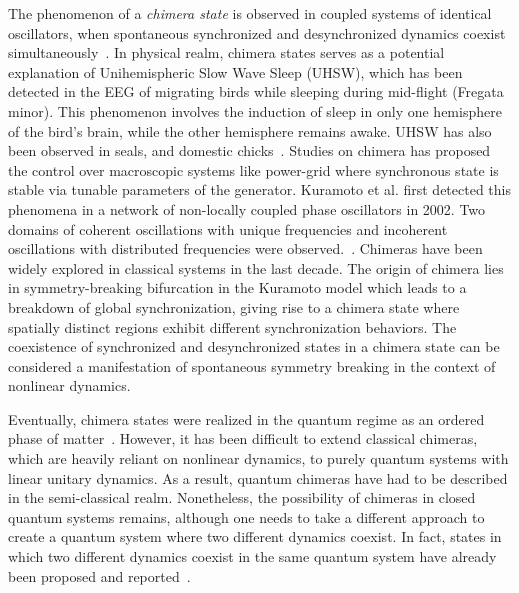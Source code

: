 \documentclass[12pt]{iopart}
\begin{document}
The phenomenon of a \textit{ chimera state} is observed in coupled systems of  identical oscillators, when spontaneous synchronized and desynchronized dynamics coexist simultaneously~\cite{kuramoto_coexistence_2002, panaggio_chimera_2015}. In physical realm, chimera states serves as a potential explanation of Unihemispheric Slow Wave Sleep (UHSW), which has been detected in the EEG of migrating birds while sleeping during mid-flight (Fregata minor\cite{Rattenborg2016}). This phenomenon involves the induction of sleep in only one hemisphere of the bird's brain, while the other hemisphere remains awake. UHSW has also been observed in seals, and domestic chicks~\cite{Mascetti2016}. Studies on chimera has proposed the control over macroscopic systems like power-grid where synchronous state is stable via tunable parameters of the generator\cite{Motter2013}. Kuramoto et al. first detected this phenomena in a network of non-locally coupled phase oscillators in 2002. Two domains of coherent oscillations with unique frequencies and incoherent oscillations with distributed frequencies were observed.~\cite{kuramoto_coexistence_2002}.
Chimeras have been widely explored in classical systems in the last decade\cite{parastesh_chimeras_2021,chimera_book, taniya2022}. The origin of chimera lies in symmetry-breaking bifurcation in the Kuramoto model\cite{Kotwal2017} which leads to a breakdown of global synchronization, giving rise to a chimera state where spatially distinct regions exhibit different synchronization behaviors. The coexistence of synchronized and desynchronized states in a chimera state can be considered a manifestation of spontaneous symmetry breaking in the context of nonlinear dynamics\cite{Aneta2013}.

Eventually, chimera states were realized in the quantum regime as an ordered phase of matter~\cite{bastidas_quantum_2015}. However, it has been difficult to extend classical chimeras, which are heavily reliant on nonlinear dynamics, to purely quantum systems with linear unitary dynamics. As a result, quantum chimeras have had to be described in the semi-classical realm. Nonetheless, the possibility of chimeras in closed quantum systems remains, although one needs to take a different approach to create a quantum system where two different dynamics coexist. In fact, states in which two different dynamics coexist in the same quantum system have already been proposed and reported~\cite{Bastidas2018, Zha2020, sakurai_phys_nodate}.
\end{document}
